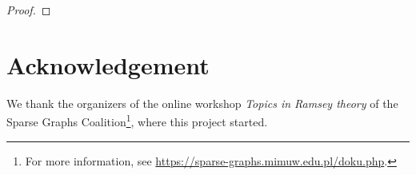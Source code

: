 \documentclass{article}
\begin{document}
\begin{proof}
\end{proof}






\section*{Acknowledgement}
We thank the organizers of the online workshop \emph{Topics in Ramsey theory} of the Sparse Graphs Coalition\footnote{For more information, see \url{https://sparse-graphs.mimuw.edu.pl/doku.php}.}, where this project started.



\end{document}
